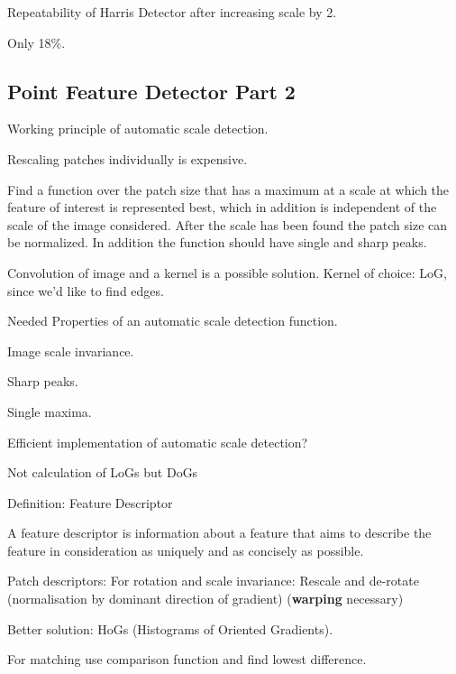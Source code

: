 \documentclass[10pt,a4paper]{scrartcl}
\begin{document}
\begin{multicols*}{2}
\begin{QandA}{Repeatability of Harris Detector after increasing scale by 2.}
\item Only 18\%.
\end{QandA}

\subsection*{Point Feature Detector Part 2}

\begin{QandA}
{Working principle of automatic scale detection.}
\item Rescaling patches individually is expensive.
\item Find a function over the patch size that has a maximum at a scale at which the feature of interest is represented best, which in addition is independent of the scale of the image considered. After the scale has been found the patch size can be normalized. In addition the function should have single and sharp peaks.
\item Convolution of image and a kernel is a possible solution. Kernel of choice: LoG, since we'd like to find edges.
\end{QandA}

\begin{QandA}
{Needed Properties of an automatic scale detection function.}
\item Image scale invariance.
\item Sharp peaks.
\item Single maxima.
\end{QandA} 

\begin{QandA}
{Efficient implementation of automatic scale detection?}
\item Not calculation of LoGs but DoGs
\end{QandA}

\begin{QandA}
{Definition: Feature Descriptor}
\item A feature descriptor is information about a feature that aims to describe the feature in consideration as uniquely and as concisely as possible.
\item Patch descriptors: For rotation and scale invariance: Rescale and de-rotate (normalisation by dominant direction of gradient) (\textbf{warping} necessary)
\item Better solution: HoGs (Histograms of Oriented Gradients).
\item For matching use comparison function and find lowest difference.
\end{QandA}  


\end{multicols*}
\end{document}
